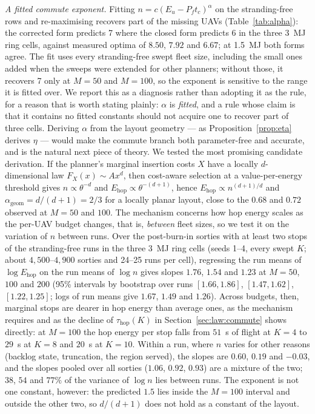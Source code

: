 \documentclass[journal,outdir=./]{IEEEtran}
\newcommand{\Pf}{P_{f}}
\newcommand{\Eu}{E_{u}}
\begin{document}
\textit{A fitted commute exponent.} Fitting $n=c(\Eu-\Pf t_c)^{\alpha}$ on the stranding-free rows and re-maximising recovers part of the missing UAVs (Table~\ref{tab:alpha}): the corrected form predicts 7 where the closed form predicts 6 in the three 3~MJ ring cells, against measured optima of $8.50$, $7.92$ and $6.67$; at 1.5~MJ both forms agree. The fit uses every stranding-free swept fleet size, including the small ones added when the sweeps were extended for other planners; without those, it recovers 7 only at $M=50$ and $M=100$, so the exponent is sensitive to the range it is fitted over. We report this as a diagnosis rather than adopting it as the rule, for a reason that is worth stating plainly: $\alpha$ is \emph{fitted}, and a rule whose claim is that it contains no fitted constants should not acquire one to recover part of three cells. Deriving $\alpha$ from the layout geometry --- as Proposition~\ref{prop:eta} derives $\eta$ --- would make the commute branch both parameter-free and accurate, and is the natural next piece of theory. We tested the most promising candidate derivation. If the planner's marginal insertion costs $X$ have a locally $d$-dimensional law $F_X(x)\sim Ax^{d}$, then cost-aware selection at a value-per-energy threshold gives $n\propto\theta^{-d}$ and $E_{\mathrm{hop}}\propto\theta^{-(d+1)}$, hence $E_{\mathrm{hop}}\propto n^{(d+1)/d}$ and $\alpha_{\mathrm{geom}}=d/(d+1)=2/3$ for a locally planar layout, close to the $0.68$ and $0.72$ observed at $M=50$ and $100$. The mechanism concerns how hop energy scales as the per-UAV budget changes, that is, \emph{between} fleet sizes, so we test it on the variation of $n$ between runs. Over the post-burn-in sorties with at least two stops of the stranding-free runs in the three 3~MJ ring cells (seeds 1--4, every swept $K$; about $4{,}500$--$4{,}900$ sorties and 24--25 runs per cell), regressing the run means of $\log E_{\mathrm{hop}}$ on the run means of $\log n$ gives slopes $1.76$, $1.54$ and $1.23$ at $M=50$, $100$ and $200$ (95\% intervals by bootstrap over runs $[1.66,1.86]$, $[1.47,1.62]$, $[1.22,1.25]$; logs of run means give $1.67$, $1.49$ and $1.26$). Across budgets, then, marginal stops are dearer in hop energy than average ones, as the mechanism requires and as the decline of $\tau_{\mathrm{hop}}(K)$ in Section~\ref{sec:law:commute} shows directly: at $M=100$ the hop energy per stop falls from $51$~s of flight at $K=4$ to $29$~s at $K=8$ and $20$~s at $K=10$. Within a run, where $n$ varies for other reasons (backlog state, truncation, the region served), the slopes are $0.60$, $0.19$ and $-0.03$, and the slopes pooled over all sorties ($1.06$, $0.92$, $0.93$) are a mixture of the two; $38$, $54$ and $77\%$ of the variance of $\log n$ lies between runs. The exponent is not one constant, however: the predicted $1.5$ lies inside the $M=100$ interval and outside the other two, so $d/(d+1)$ does not hold as a constant of the layout.
\end{document}
